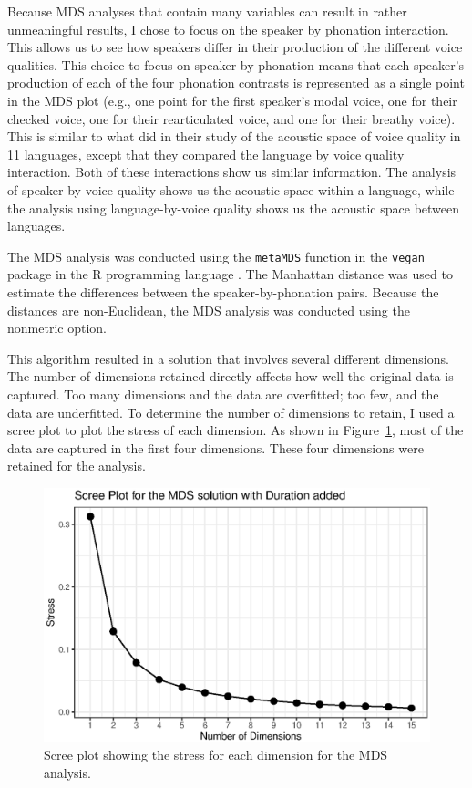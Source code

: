 Because MDS analyses that contain many variables can result in rather unmeaningful results, I chose to focus on the speaker by phonation interaction. This allows us to see how speakers differ in their production of the different voice qualities. This choice to focus on speaker by phonation means that each speaker's production of each of the four phonation contrasts is represented as a single point in the MDS plot (e.g., one point for the first speaker's modal voice, one for their checked voice, one for their rearticulated voice, and one for their breathy voice). This is similar to what \citet{keatingCrosslanguageAcousticSpace2023} did in their study of the acoustic space of voice quality in 11 languages, except that they compared the language by voice quality interaction. Both of these interactions show us similar information. The analysis of speaker-by-voice quality shows us the acoustic space within a language, while the analysis using language-by-voice quality shows us the acoustic space between languages.

The MDS analysis was conducted using the \texttt{metaMDS} function in the \texttt{vegan} package \citep{oksanenVeganCommunityEcology2025} in the R programming language \citep{rcoreteamLanguageEnvironmentStatistical2024}. The Manhattan distance was used to estimate the differences between the speaker-by-phonation pairs. Because the distances are non-Euclidean, the MDS analysis was conducted using the nonmetric option.

This algorithm resulted in a solution that involves several different dimensions. The number of dimensions retained directly affects how well the original data is captured. Too many dimensions and the data are overfitted; too few, and the data are underfitted. To determine the number of dimensions to retain, I used a scree plot to plot the stress of each dimension. As shown in Figure~\ref{fig:stress_plot}, most of the data are captured in the first four dimensions. These four dimensions were retained for the analysis.

\begin{figure}[h!]
    \centering
    \includegraphics[width = 0.9\linewidth]{images/MDS/stress_plot_dur.eps}
    \caption{Scree plot showing the stress for each dimension for the MDS analysis.}
    \label{fig:stress_plot}
\end{figure}

